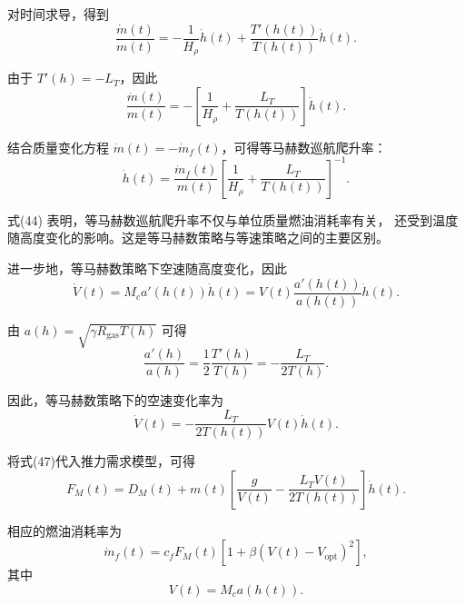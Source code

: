 \documentclass[UTF8]{ctexart}
\begin{document}
对时间求导，得到
\begin{equation}
    \frac{\dot m(t)}{m(t)}
    =
    -\frac{1}{H_\rho}\dot h(t)
    +
    \frac{T'(h(t))}{T(h(t))}\dot h(t).
    \label{eq:constant_mach_derivative}
\end{equation}

由于 $T'(h)=-L_T$，因此
\begin{equation}
    \frac{\dot m(t)}{m(t)}
    =
    -
    \left[
    \frac{1}{H_\rho}
    +
    \frac{L_T}{T(h(t))}
    \right]
    \dot h(t).
    \label{eq:constant_mach_mdot}
\end{equation}

结合质量变化方程 $\dot m(t)=-\dot m_f(t)$，可得等马赫数巡航爬升率：
\begin{equation}
    \dot h(t)
    =
    \frac{\dot m_f(t)}{m(t)}
    \left[
    \frac{1}{H_\rho}
    +
    \frac{L_T}{T(h(t))}
    \right]^{-1}.
    \label{eq:constant_mach_h_dot}
\end{equation}

式(44) 表明，等马赫数巡航爬升率不仅与单位质量燃油消耗率有关，
还受到温度随高度变化的影响。这是等马赫数策略与等速策略之间的主要区别。

进一步地，等马赫数策略下空速随高度变化，因此
\begin{equation}
    \dot V(t)
    =
    M_c a'(h(t))\dot h(t)
    =
    V(t)\frac{a'(h(t))}{a(h(t))}\dot h(t).
    \label{eq:constant_mach_Vdot}
\end{equation}

由 $a(h)=\sqrt{\gamma R_{\mathrm{gas}}T(h)}$ 可得
\begin{equation}
    \frac{a'(h)}{a(h)}
    =
    \frac{1}{2}\frac{T'(h)}{T(h)}
    =
    -\frac{L_T}{2T(h)}.
    \label{eq:constant_mach_adot}
\end{equation}

因此，等马赫数策略下的空速变化率为
\begin{equation}
    \dot V(t)
    =
    -
    \frac{L_T}{2T(h(t))}
    V(t)\dot h(t).
    \label{eq:constant_mach_Vdot_final}
\end{equation}

将式(47)代入推力需求模型，可得
\begin{equation}
    F_M(t)
    =
    D_M(t)
    +
    m(t)
    \left[
    \frac{g}{V(t)}
    -
    \frac{L_TV(t)}{2T(h(t))}
    \right]
    \dot h(t).
    \label{eq:constant_mach_thrust}
\end{equation}

相应的燃油消耗率为
\begin{equation}
    \dot m_f(t)
    =
    c_fF_M(t)
    \left[
    1+\beta\left(V(t)-V_{\mathrm{opt}}\right)^2
    \right],
    \label{eq:constant_mach_fuel}
\end{equation}
其中
\begin{equation}
    V(t)=M_ca(h(t)).
    \label{eq:constant_mach_speed}
\end{equation}
\end{document}
